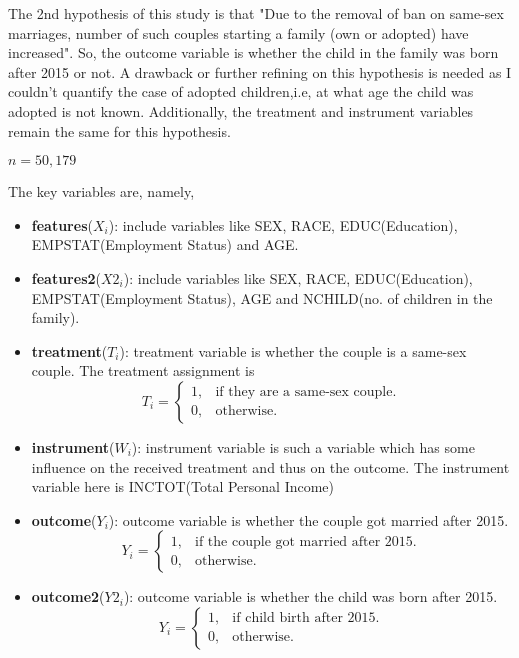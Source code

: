 \documentclass[11pt, a4paper, leqno]{article}
\begin{document}
The 2nd hypothesis of this study is that "Due to the removal of ban on same-sex marriages, number of such couples starting a family (own or 
adopted) have increased". So, the outcome variable is whether the child in the family was born after 2015 or not. A drawback or further refining 
on this hypothesis is needed as I couldn't quantify the case of adopted children,i.e, at what age the child was adopted is not known.
Additionally, the treatment and instrument variables remain the same for this hypothesis.

$n = 50,179$ 

The key variables are, namely,
\begin{itemize}
    \item \textbf{features}($X_i$): include variables like SEX, RACE, EDUC(Education), EMPSTAT(Employment Status) and AGE.
    \item \textbf{features2}($X2_i$): include variables like SEX, RACE, EDUC(Education), EMPSTAT(Employment Status), AGE and 
                                    NCHILD(no. of children in the family).
    \item \textbf{treatment}($T_i$): treatment variable is whether the couple is a same-sex couple. The treatment assignment is
     \[T_i=\begin{cases}
               1, & \text{if they are a same-sex couple}.\\
               0, & \text{otherwise}.
                   \end{cases}\]
    \item \textbf{instrument}($W_i$): instrument variable is such a variable which has some influence on the received treatment and thus on 
                                    the outcome. The instrument variable here is INCTOT(Total Personal Income)
    \item \textbf{outcome}($Y_i$): outcome variable is whether the couple got married after 2015. 
     \[Y_i=\begin{cases}
               1, & \text{if the couple got married after 2015}.\\
               0, & \text{otherwise}.
                   \end{cases}\]
    \item \textbf{outcome2}($Y2_i$): outcome variable is whether the child was born after 2015. 
     \[Y_i=\begin{cases}
               1, & \text{if child birth after 2015}.\\
               0, & \text{otherwise}.
                   \end{cases}\]
\end{itemize}
\end{document}
